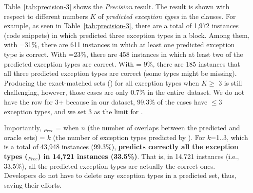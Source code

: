 Table~\ref{tab:precision-3} shows the {\em Precision} result.
The result is shown with respect to different numbers $K$ of {\em
  predicted exception types} in the  clauses. For example,
as seen in Table~\ref{tab:precision-3}, there are a total of 1,972
instances (code snippets) in which {\tool} predicted three exception
types in a  block. Among them, with =31\%,
there are 611 instances in which at least one predicted exception type
is correct. With =23\%, there are 458 instances in which
at least two of the predicted exception types are correct. With
 = 9\%, there are 185 instances that all three predicted
exception types are correct (some types might be missing).  Producing
the exact-matched sets () for all exception types when
$K \ge$ 3 is still challenging, however, those cases are only 0.7\% in
the entire~dataset. We do not have the row for 3+ because in our
dataset, 99.3\% of the cases have $\leq$3 exception types, and we
set 3 as the limit for {\xtype}.

Importantly, $_{Prec}$ =  when
$n$ (the number of overlaps between the predicted and oracle sets) =
$k$ (the number of exception types predicted by {\tool}).
For $k$=1..3, which is a total of 43,948 instances (99.3\%), {\bf
  {\tool} predicts correctly all the exception types
  ($_{Prec}$) in 14,721 instances (33.5\%)}. That is, in
14,721 instances (i.e., 33.5\%), all the predicted exception types are
actually the correct ones. Developers do not have to delete any
exception types in a predicted set, thus, saving their efforts.




